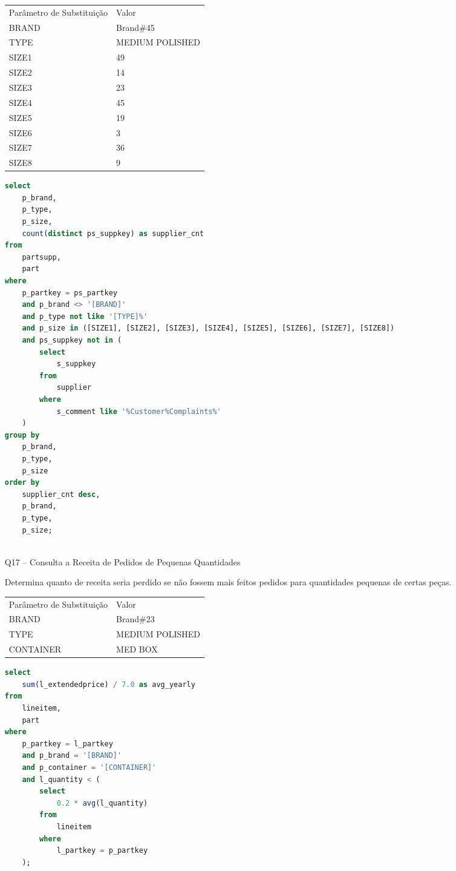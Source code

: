 \begin{enumerate}
\begin{tabular}{ll}
	Parâmetro de Substituição & Valor\\
	BRAND & Brand$\#$45\\
	TYPE & MEDIUM POLISHED \\
	SIZE1 & 49 \\
	SIZE2 & 14 \\
	SIZE3 & 23 \\
	SIZE4 & 45 \\
	SIZE5 & 19 \\
	SIZE6 &  3 \\
	SIZE7 & 36 \\
	SIZE8 &  9 \\
\end{tabular}

	\begin{lstlisting}[language=SQL]
select
	p_brand,
	p_type,
	p_size,
	count(distinct ps_suppkey) as supplier_cnt
from
	partsupp,
	part
where
	p_partkey = ps_partkey
	and p_brand <> '[BRAND]'
	and p_type not like '[TYPE]%'
	and p_size in ([SIZE1], [SIZE2], [SIZE3], [SIZE4], [SIZE5], [SIZE6], [SIZE7], [SIZE8])
	and ps_suppkey not in (
		select
			s_suppkey
		from
			supplier
		where
			s_comment like '%Customer%Complaints%'
	)
group by
	p_brand,
	p_type,
	p_size
order by
	supplier_cnt desc,
	p_brand,
	p_type,
	p_size;
	
	\end{lstlisting}

\item[Q17 --] Consulta a Receita de Pedidos de Pequenas Quantidades

Determina quanto de receita seria perdido se não fossem mais feitos pedidos para quantidades pequenas de certas peças.

\begin{tabular}{ll}
	Parâmetro de Substituição & Valor\\
	BRAND & Brand$\#$23\\
	TYPE & MEDIUM POLISHED \\
	CONTAINER & MED BOX \\
\end{tabular}

	\begin{lstlisting}[language=SQL]
select
	sum(l_extendedprice) / 7.0 as avg_yearly
from
	lineitem,
	part
where
	p_partkey = l_partkey
	and p_brand = '[BRAND]'
	and p_container = '[CONTAINER]'
	and l_quantity < (
		select
			0.2 * avg(l_quantity)
		from
			lineitem
		where
			l_partkey = p_partkey
	);
	

\end{lstlisting}
\end{enumerate}
